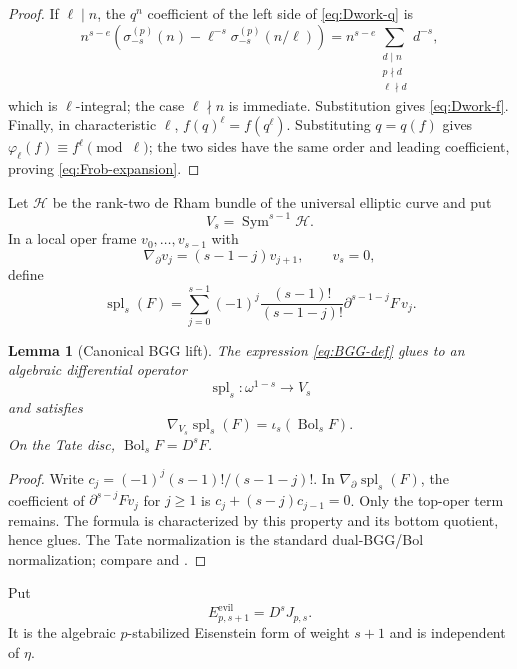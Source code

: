 \documentclass[11pt]{article}
\newtheorem{lemma}[lemma]{Lemma}
\theoremstyle{definition}
\theoremstyle{remark}
\newcommand{\Sym}{\operatorname{Sym}}
\newcommand{\calH}{\mathcal H}
\begin{document}
\begin{proof}
If $\ell\mid n$, the $q^n$ coefficient of the left side of
\eqref{eq:Dwork-q} is
\[
 n^{s-e}\left(\sigma_{-s}^{(p)}(n)
 -\ell^{-s}\sigma_{-s}^{(p)}(n/\ell)\right)
 =n^{s-e}\sum_{\substack{d\mid n\\p\nmid d\\\ell\nmid d}}d^{-s},
\]
which is $\ell$-integral; the case $\ell\nmid n$ is immediate.  Substitution
gives \eqref{eq:Dwork-f}.  Finally, in characteristic $\ell$,
$f(q)^\ell=f(q^\ell)$.  Substituting $q=q(f)$ gives
$\varphi_\ell(f)\equiv f^\ell\pmod\ell$; the two sides have the same order
and leading coefficient, proving \eqref{eq:Frob-expansion}.
\end{proof}

Let $\calH$ be the rank-two de Rham bundle of the universal elliptic curve and
put
\[
 V_s=\Sym^{s-1}\calH.
\]
In a local oper frame $v_0,\ldots,v_{s-1}$ with
\[
 \nabla_\partial v_j=(s-1-j)v_{j+1},
 \qquad v_s=0,
\]
define
\begin{equation}\label{eq:BGG-def}
 \operatorname{spl}_s(F)=
 \sum_{j=0}^{s-1}(-1)^j\frac{(s-1)!}{(s-1-j)!}
 \partial^{s-1-j}F\,v_j.
\end{equation}

\begin{lemma}[Canonical BGG lift]\label{lem:BGG}
The expression \eqref{eq:BGG-def} glues to an algebraic differential operator
\[
 \operatorname{spl}_s:\omega^{1-s}\longrightarrow V_s
\]
and satisfies
\begin{equation}\label{eq:BGG}
 \nabla_{V_s}\operatorname{spl}_s(F)=\iota_s(\operatorname{Bol}_sF).
\end{equation}
On the Tate disc, $\operatorname{Bol}_sF=D^sF$.
\end{lemma}

\begin{proof}
Write $c_j=(-1)^j(s-1)!/(s-1-j)!$.  In
$\nabla_\partial\operatorname{spl}_s(F)$, the coefficient of
$\partial^{s-j}Fv_j$ for $j\ge1$ is
$c_j+(s-j)c_{j-1}=0$.  Only the top-oper term remains.  The formula is
characterized by this property and its bottom quotient, hence glues.
The Tate normalization is the standard dual-BGG/Bol normalization; compare
\cite[Proposition~2.4.3]{RodriguezCamargo2023} and
\cite[Proposition~2.4.1]{Urban2013}.
\end{proof}

Put
\begin{equation}\label{eq:Eevil}
 E_{p,s+1}^{\mathrm{evil}}=D^sJ_{p,s}.
\end{equation}
It is the algebraic $p$-stabilized Eisenstein form of weight $s+1$ and is
independent of $\eta$.
\end{document}
